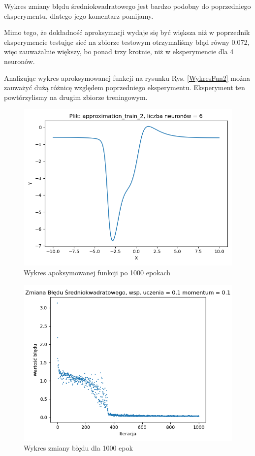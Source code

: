 \documentclass[12pt]{article}
\begin{document}
Wykres zmiany błędu średniokwadratowego jest bardzo podobny do poprzedniego eksperymentu, dlatego jego komentarz pomijamy.

Mimo tego, że dokładność aproksymacji wydaje się być większa niż w poprzednik eksperymencie testując sieć na zbiorze testowym otrzymaliśmy błąd równy 0.072, więc zauważalnie większy, bo ponad trzy krotnie, niż w eksperymencie dla 4 neuronów. 

Analizując wykres aproksymowanej funkcji na rysunku Rys. \ref{WykresFun2} można zauważyć dużą różnicę względem poprzedniego eksperymentu.
\newpage
Eksperyment ten powtórzylismy na drugim zbiorze treningowym. 

\begin{figure}[!htb]
 \centering
 \includegraphics[width=12cm]{FunctionPlot6NeuronZbior2.png}
 \caption{Wykres apoksymowanej funkcji po 1000 epokach}
 \vspace{-0.3cm}
 \label{WykresFun5}
\end{figure}



\begin{figure}[!htb]
 \centering
 \includegraphics[width=12cm]{ZmianaBledu6NeuronZbior2.png}
 \vspace{-0.3cm}
 \caption{Wykres zmiany błędu dla 1000 epok}
 \label{WykresBlad5}
\end{figure}
\end{document}

